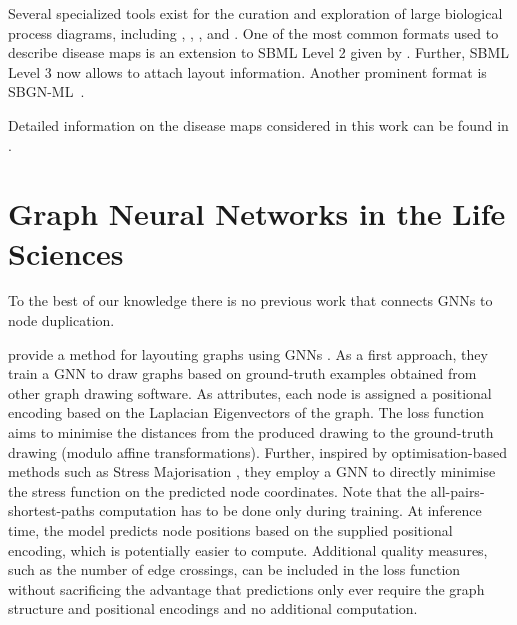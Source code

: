\documentclass[
	fontsize=10pt, %
	twoside=true, %
	secnumdepth=1, %
  toc=indentunnumbered %
]{kaobook}
\begin{document}
Several specialized tools exist for the curation and exploration of large
biological process diagrams, including 
\cite{funahashi_CellDesignerVersatileModeling_2008}, 
\cite{gawron_MINERVAPlatformVisualization_2016}, 
\cite{kuperstein_NaviCellWebbasedEnvironment_2013}, 
\cite{shannon_cytoscape_2003} and 
\cite{rohn_VANTEDV2Framework_2012}.
%
One of the most common formats used to describe disease maps is an extension to SBML
Level 2 given by . Further, SBML Level 3 now allows to attach
layout information. Another prominent format is SBGN-ML~\cite{bergmann_SystemsBiologyGraphical_2020}.

Detailed information on the disease maps considered in this work can be found in
.



\section{Graph Neural Networks in the Life Sciences}
\label{sec:gnn-applications}




To the best of our knowledge there is no previous work that connects GNNs to
node duplication.

\citeauthor{tiezzi_GraphNeuralNetworks_2021} provide a method for layouting
graphs using GNNs
\cite{tiezzi_GraphNeuralNetworks_2021}
. As a first approach, they train a GNN to draw graphs based on
ground-truth examples obtained from other graph drawing software. As attributes,
each node is assigned a positional encoding based on the Laplacian Eigenvectors
of the graph. The loss function aims to minimise the distances from the produced
drawing to the ground-truth drawing (modulo affine transformations).
Further, inspired by optimisation-based methods such as Stress Majorisation
\cite{gansner_GraphDrawingStress_2005}, they employ a GNN to directly minimise
the stress function on the predicted node coordinates. Note that the
all-pairs-shortest-paths computation has to be done only during training. At
inference time, the model predicts node positions based on the supplied
positional encoding, which is potentially easier to compute. Additional quality
measures, such as the number of edge crossings, can be included in the loss
function without sacrificing the advantage that predictions only ever require
the graph structure and positional encodings and no additional computation.
\end{document}
